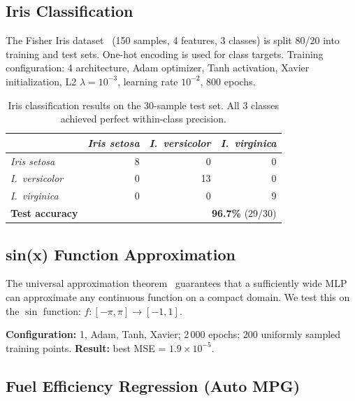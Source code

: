 \documentclass[11pt,a4paper]{article}
\begin{document}
\subsection{Iris Classification}

The Fisher Iris dataset~\cite{fisher1936} (150 samples, 4 features, 3 classes)
is split 80/20 into training and test sets. One-hot encoding is used for class
targets. Training configuration: 4
architecture, Adam optimizer, Tanh activation, Xavier initialization,
L2 $\lambda=10^{-3}$, learning rate $10^{-2}$, 800 epochs.

\begin{table}[H]
\centering
\caption{Iris classification results on the 30-sample test set.
  All 3 classes achieved perfect within-class precision.}
\label{tab:iris}
\renewcommand{\arraystretch}{1.2}
\begin{tabular}{@{}lrrr@{}}
\toprule
 & \textit{Iris setosa} & \textit{I.\ versicolor} & \textit{I.\ virginica} \\
\midrule
\textit{Iris setosa}     &  8 & 0 & 0 \\
\textit{I.\ versicolor}  &  0 & 13 & 0 \\
\textit{I.\ virginica}   &  0 & 0 & 9 \\
\midrule
\textbf{Test accuracy}   & \multicolumn{3}{r}{\textbf{96.7\%} (29/30)} \\
\bottomrule
\end{tabular}
\end{table}

\subsection{sin(x) Function Approximation}

The universal approximation theorem~\cite{cybenko1989,hornik1989} guarantees
that a sufficiently wide MLP can approximate any continuous function on a
compact domain. We test this on the $\sin$ function:
$f : [-\pi, \pi] \to [-1, 1]$.

\textbf{Configuration:} 1, Adam, Tanh,
Xavier; 2\,000 epochs; 200 uniformly sampled training points.
\textbf{Result:} best MSE = $1.9 \times 10^{-5}$.

\subsection{Fuel Efficiency Regression (Auto MPG)}
\end{document}
